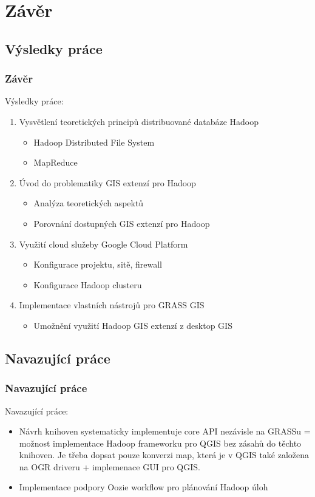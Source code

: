 \documentclass[unicode,bookmarksnumbered]{beamer}
\begin{document}
	\section{Závěr}
	\subsection{Výsledky práce}		
	\begin{frame}
		\frametitle{Závěr}
		Výsledky práce:
		\begin{enumerate}
			\item  Vysvětlení teoretických principů distribuované databáze Hadoop
				\begin{itemize}
					\item Hadoop Distributed File System
					\item MapReduce
				\end{itemize}
			\item Úvod do problematiky GIS extenzí pro Hadoop
				\begin{itemize}
					\item Analýza teoretických aspektů
					\item Porovnání dostupných GIS extenzí pro Hadoop
				\end{itemize}
			\item Využití cloud služeby Google Cloud Platform
				\begin{itemize}
					\item Konfigurace projektu, sitě, firewall
					\item Konfigurace Hadoop clusteru
				\end{itemize}
			\item Implementace vlastních nástrojů pro GRASS GIS
				\begin{itemize}
					\item Umožnění využití Hadoop GIS extenzí z desktop GIS
				\end{itemize}
		\end{enumerate}
	\end{frame}
	
	\subsection{Navazující práce}	
	\begin{frame}
		\frametitle{Navazující práce}
		Navazující práce:
		\begin{itemize}
			\item Návrh knihoven systematicky implementuje core API nezávisle na GRASSu = možnost implementace Hadoop frameworku pro QGIS bez zásahů do těchto knihoven. Je třeba dopsat pouze konverzi map, která je v QGIS také založena na OGR driveru + implemenace GUI pro QGIS. 
			
			\item Implementace podpory Oozie workflow pro plánování Hadoop úloh  
		\end{itemize}
	\end{frame}
	
\end{document}
